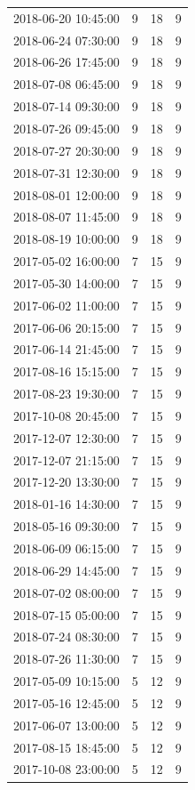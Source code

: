 \begin{tabular}{lrrr}
2018-06-20 10:45:00 & 9 & 18 & 9 \\
2018-06-24 07:30:00 & 9 & 18 & 9 \\
2018-06-26 17:45:00 & 9 & 18 & 9 \\
2018-07-08 06:45:00 & 9 & 18 & 9 \\
2018-07-14 09:30:00 & 9 & 18 & 9 \\
2018-07-26 09:45:00 & 9 & 18 & 9 \\
2018-07-27 20:30:00 & 9 & 18 & 9 \\
2018-07-31 12:30:00 & 9 & 18 & 9 \\
2018-08-01 12:00:00 & 9 & 18 & 9 \\
2018-08-07 11:45:00 & 9 & 18 & 9 \\
2018-08-19 10:00:00 & 9 & 18 & 9 \\
2017-05-02 16:00:00 & 7 & 15 & 9 \\
2017-05-30 14:00:00 & 7 & 15 & 9 \\
2017-06-02 11:00:00 & 7 & 15 & 9 \\
2017-06-06 20:15:00 & 7 & 15 & 9 \\
2017-06-14 21:45:00 & 7 & 15 & 9 \\
2017-08-16 15:15:00 & 7 & 15 & 9 \\
2017-08-23 19:30:00 & 7 & 15 & 9 \\
2017-10-08 20:45:00 & 7 & 15 & 9 \\
2017-12-07 12:30:00 & 7 & 15 & 9 \\
2017-12-07 21:15:00 & 7 & 15 & 9 \\
2017-12-20 13:30:00 & 7 & 15 & 9 \\
2018-01-16 14:30:00 & 7 & 15 & 9 \\
2018-05-16 09:30:00 & 7 & 15 & 9 \\
2018-06-09 06:15:00 & 7 & 15 & 9 \\
2018-06-29 14:45:00 & 7 & 15 & 9 \\
2018-07-02 08:00:00 & 7 & 15 & 9 \\
2018-07-15 05:00:00 & 7 & 15 & 9 \\
2018-07-24 08:30:00 & 7 & 15 & 9 \\
2018-07-26 11:30:00 & 7 & 15 & 9 \\
2017-05-09 10:15:00 & 5 & 12 & 9 \\
2017-05-16 12:45:00 & 5 & 12 & 9 \\
2017-06-07 13:00:00 & 5 & 12 & 9 \\
2017-08-15 18:45:00 & 5 & 12 & 9 \\
2017-10-08 23:00:00 & 5 & 12 & 9 \\

\end{tabular}
